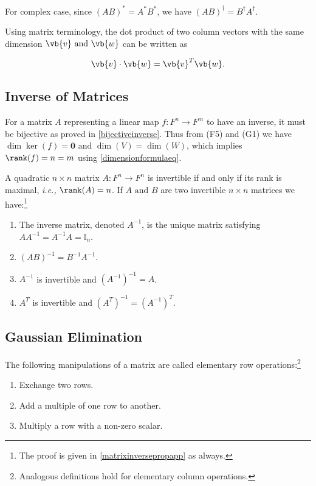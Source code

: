 \documentclass[a4paper,12pt]{report}
\begin{document}
For complex case, since \((AB)^* = A^*B^*\), we have \((AB)^{\dagger} = B^{\dagger} A^{\dagger}\). 

Using matrix terminology, the dot product of two column vectors with the same dimension \(\vb{v} \text { and } \vb{w} \) can be written as 

\begin{equation}
    \vb{v} \cdot \vb{w} = \vb{v} ^{T} \vb{w}.
\end{equation}

\subsection{Inverse of Matrices}

For a matrix \(A\) representing a linear map \(f:F^{n} \rightarrow F^{m} \) to have an inverse, it must be bijective as proved in \cref{bijectiveinverse}. Thus from (F5) and (G1) we have \(\dim \ker (f) = \boldsymbol{0} \text { and } \dim (V) = \dim (W)\), which implies \(\rank (f) = n = m\) using \cref{dimensionformulaeq}.

\begin{lemma} \label{matrixinverseprop} 
A quadratic \(n \times n\) matrix \(A:F^{n}\rightarrow F^{n}  \) is invertible if and only if its rank is maximal, \textit{i.e.,} \(\rank (A) = n\). If \(A \text { and } B\) are two invertible \(n\times n\) matrices we have:\footnote{The proof is given in \cref{matrixinversepropapp} as always.} 

\begin{enumerate}[label=(\(H\)\arabic*)]
    \item The inverse matrix, denoted \(A^{-1} \), is the unique matrix satisfying \(AA^{-1} = A^{-1} A = \mathbb{I}_{n} \).
    \item \((AB)^{-1} = B^{-1} A^{-1} \).
    \item \(A^{-1} \) is invertible and \((A^{-1} )^{-1} = A\).
    \item \(A^{T} \) is invertible and \((A^{T} ) ^{-1} = (A^{-1} )^{T} \).   
\end{enumerate}

\end{lemma}


\subsection{Gaussian Elimination}

\begin{definition}
The following manipulations of a matrix are called elementary row operations:\footnote{Analogous definitions hold for elementary column operations.}

\begin{enumerate}[label=(\(I\)\arabic*)]
    \item Exchange two rows.
    \item Add a multiple of one row to another.
    \item Multiply a row with a non-zero scalar.
\end{enumerate}

\end{definition}
\end{document}
